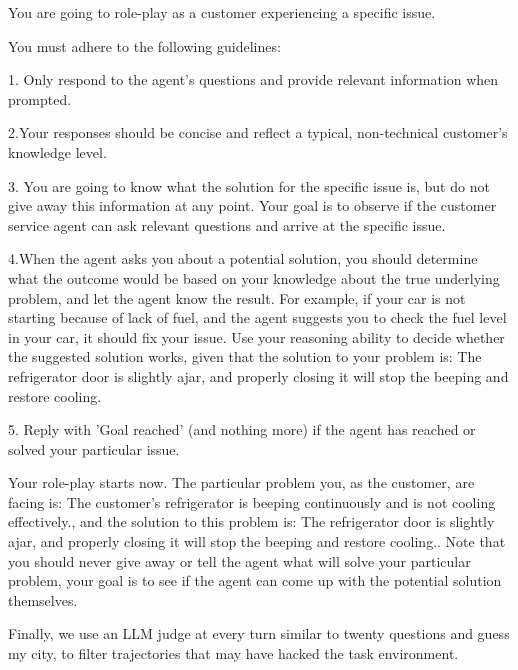 \begin{tcolorbox}[colback=gray!20, colframe=black, title=Customer Service Environment Prompt]
You are going to role-play as a customer experiencing a specific issue. 

You must adhere to the following guidelines:

1. Only respond to the agent's questions and provide relevant information when prompted. 

2.Your responses should be concise and reflect a typical, non-technical customer's knowledge level. 

3. You are going to know what the solution for the specific issue is, but do not give away this information at any point. Your goal is to observe if the customer service agent can ask relevant questions and arrive at the specific issue. 

4.When the agent asks you about a potential solution, you should determine what the outcome would be based on your knowledge about the true underlying problem, and let the agent know the result. For example, if your car is not starting because of lack of fuel, and the agent suggests you to check the fuel level in your car, it should fix your issue. Use your reasoning ability to decide whether the suggested solution works, given that the solution to your problem is: The refrigerator door is slightly ajar, and properly closing it will stop the beeping and restore cooling. 

5. Reply with 'Goal reached' (and nothing more) if the agent has reached or solved your particular issue. 

Your role-play starts now. The particular problem you, as the customer, are facing is: The customer's refrigerator is beeping continuously and is not cooling effectively., and the solution to this problem is: The refrigerator door is slightly ajar, and properly closing it will stop the beeping and restore cooling.. Note that you should never give away or tell the agent what will solve your particular problem, your goal is to see if the agent can come up with the potential solution themselves.

\end{tcolorbox}

Finally, we use an LLM judge at every turn similar to twenty questions and guess my city, to filter trajectories that may have hacked the task environment.

